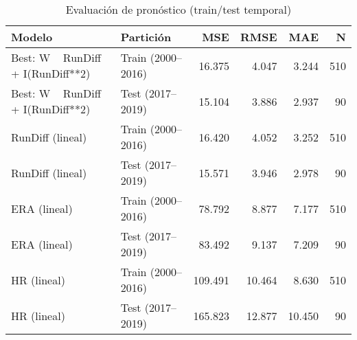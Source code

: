 \begin{table}
\caption{Evaluación de pronóstico (train/test temporal)}
\label{tab:forecast_eval}
\begin{tabular}{llrrrr}
\toprule
Modelo & Partición & MSE & RMSE & MAE & N \\
\midrule
Best: W ~ RunDiff + I(RunDiff**2) & Train (2000–2016) & 16.375 & 4.047 & 3.244 & 510 \\
Best: W ~ RunDiff + I(RunDiff**2) & Test (2017–2019) & 15.104 & 3.886 & 2.937 & 90 \\
RunDiff (lineal) & Train (2000–2016) & 16.420 & 4.052 & 3.252 & 510 \\
RunDiff (lineal) & Test (2017–2019) & 15.571 & 3.946 & 2.978 & 90 \\
ERA (lineal) & Train (2000–2016) & 78.792 & 8.877 & 7.177 & 510 \\
ERA (lineal) & Test (2017–2019) & 83.492 & 9.137 & 7.209 & 90 \\
HR (lineal) & Train (2000–2016) & 109.491 & 10.464 & 8.630 & 510 \\
HR (lineal) & Test (2017–2019) & 165.823 & 12.877 & 10.450 & 90 \\
\bottomrule
\end{tabular}
\end{table}
